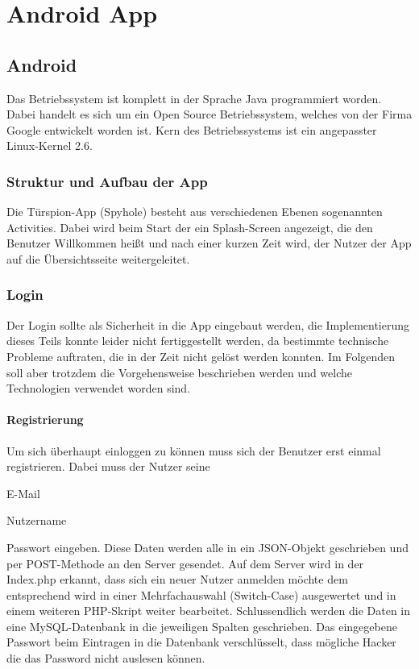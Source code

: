 
\chapter{Android App}
\section{Android}
Das Betriebssystem ist komplett in der Sprache Java programmiert worden. Dabei handelt es sich um ein Open Source Betriebssystem, welches von der Firma Google entwickelt worden ist. Kern des Betriebssystems ist ein angepasster Linux-Kernel 2.6. 
\subsection{Struktur und Aufbau der App}
Die Türspion-App (Spyhole) besteht aus verschiedenen Ebenen sogenannten Activities. Dabei wird beim Start der ein Splash-Screen angezeigt, die den Benutzer Willkommen heißt und nach einer kurzen Zeit wird, der Nutzer der App auf die Übersichtsseite weitergeleitet.
\subsection{Login}
Der Login sollte als Sicherheit in die App eingebaut werden, die Implementierung dieses Teils konnte leider nicht fertiggestellt werden, da bestimmte technische Probleme auftraten, die in der Zeit nicht gelöst werden konnten. Im Folgenden soll aber trotzdem die Vorgehensweise beschrieben werden und welche Technologien verwendet worden sind.
\subsubsection{Registrierung}
Um sich überhaupt einloggen zu können muss sich der Benutzer erst einmal registrieren. Dabei muss der Nutzer seine 
\item{E-Mail}
\item{Nutzername}
\item{Passwort}
eingeben. Diese Daten werden alle in ein JSON-Objekt geschrieben und per POST-Methode an den Server gesendet. Auf dem Server wird in der Index.php erkannt, dass sich ein neuer Nutzer anmelden möchte dem entsprechend wird in einer Mehrfachauswahl (Switch-Case) ausgewertet und in einem weiteren PHP-Skript weiter bearbeitet. Schlussendlich werden die Daten in eine MySQL-Datenbank in die jeweiligen Spalten geschrieben. Das eingegebene Passwort beim Eintragen in die Datenbank verschlüsselt, dass mögliche Hacker die das Password nicht auslesen können. 
